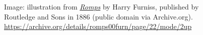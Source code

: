 \documentclass{article}
\begin{document}
\begin{figure}[p]
\begin{adjustbox}{minipage=[c]{\textwidth-10mm},margin= 5mm 5mm 5mm 5mm, frame=1pt, bgcolor=almond,env=center}
\begin{center}
\begin{minipage}[t]{0.7\paperwidth}

\end{minipage}
\end{center}
\caption*{Image: illustration from
\href{https://archive.org/details/romps00furn/page/22/mode/2up}{\emph{Romps}}
by Harry Furniss, published by Routledge and Sons in 1886 (public domain
via Archive.org).\newline
\url{https://archive.org/details/romps00furn/page/22/mode/2up}}
\end{adjustbox}
\end{figure}

\end{document}
